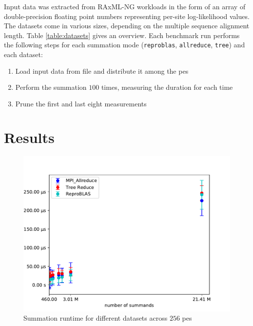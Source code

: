Input data was extracted from RAxML-NG workloads in the form of an array of double-precision floating point numbers representing per-site log-likelihood values.
The datasets come in various sizes, depending on the multiple sequence alignment length. Table \ref{table:datasets} gives an overview.
Each benchmark run performs the following steps for each summation mode (\texttt{reproblas}, \texttt{allreduce}, \texttt{tree}) and each dataset:
\begin{enumerate}
\item Load input data from file and distribute it among the \glspl{pe}
\item Perform the summation $100$ times, measuring the duration for each time
\item Prune the first and last eight measurements
\end{enumerate}

\section{Results}
\label{sec:Results}

\begin{figure}
\includegraphics[scale=1]{figures/benchmarkScatter.pdf}
\caption{Summation runtime for different datasets across $256$ \glspl{pe}}
\label{fig:benchmarkOverview}
\end{figure}


